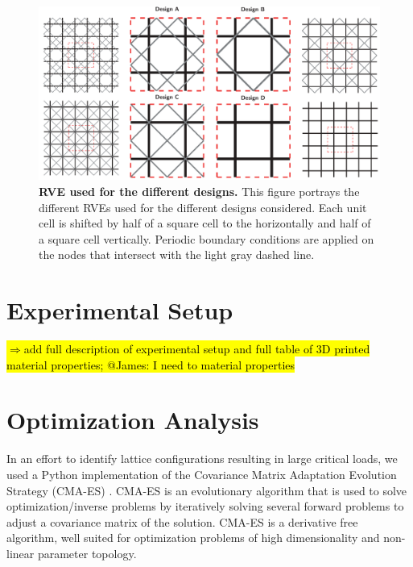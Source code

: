 \documentclass[10pt,twoside]{fernandes_supp}
\newcommand{\mf}[1]{\noindent\color{color2}\sethlcolor{cyan}\hl{$\Longrightarrow$#1}\normalcolor}
\begin{document}



\begin{figure}
    \centering
	\includegraphics[width=0.9\linewidth]{SFig10.pdf}
	\caption{{\bf RVE used for the different designs.} This figure portrays the different RVEs used for the different designs considered. Each unit cell is shifted by half of a square cell to the horizontally and half of a square cell  vertically. Periodic boundary conditions are applied on the nodes that intersect with the light gray dashed line.}
	\label{RVE}
\end{figure}

\section{Experimental Setup}
\mf{add full description of experimental setup and full table of 3D printed material properties; @James: I need to material properties}

\section{Optimization Analysis}
In an effort to identify lattice configurations resulting in large critical loads, we used a Python implementation of the Covariance Matrix Adaptation Evolution Strategy (CMA-ES) \citep{hansen2003}. CMA-ES is an evolutionary
algorithm that is used to solve optimization/inverse problems by iteratively solving several forward problems to adjust a covariance matrix of the solution. CMA-ES is a derivative free algorithm, well suited for optimization problems of high dimensionality and non-linear parameter topology.
\end{document}
